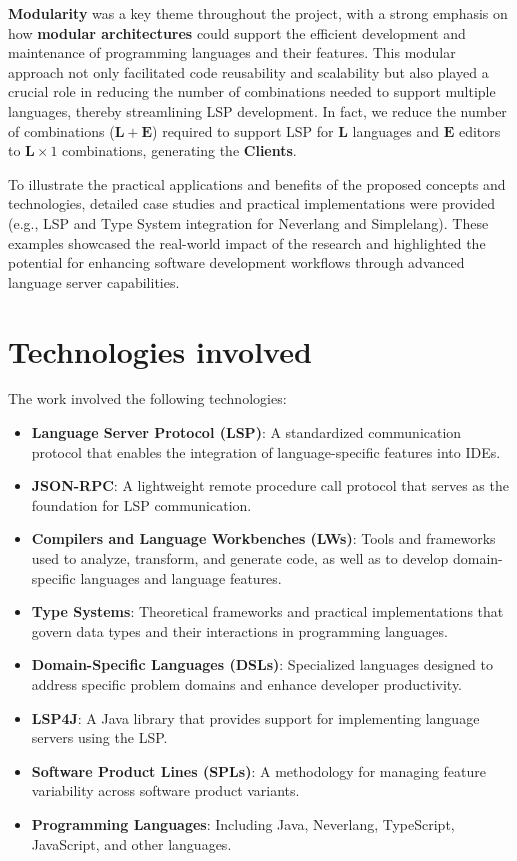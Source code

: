 \documentclass{adapt-lab}
\begin{document}
\textbf{Modularity} was a key theme throughout the project, with a strong emphasis on how \textbf{modular architectures} could support the efficient development and maintenance of programming languages and their features. This modular approach not only facilitated code reusability and scalability but also played a crucial role in reducing the number of combinations needed to support multiple languages, thereby streamlining LSP development. In fact, we reduce the number of combinations ($\mathbf{L} + \mathbf{E}$) required to support LSP for $\mathbf{L}$ languages and $\mathbf{E}$ editors to $\mathbf{L} \times 1$ combinations, generating the \textbf{Clients}.

To illustrate the practical applications and benefits of the proposed concepts and technologies, detailed case studies and practical implementations were provided (e.g., LSP and Type System integration for Neverlang and Simplelang). These examples showcased the real-world impact of the research and highlighted the potential for enhancing software development workflows through advanced language server capabilities.


\section{Technologies involved}

The work involved the following technologies:
\begin{itemize}
    \item \textbf{Language Server Protocol (LSP)}: A standardized communication protocol that enables the integration of language-specific features into IDEs.
    \item \textbf{JSON-RPC}: A lightweight remote procedure call protocol that serves as the foundation for LSP communication.
    \item \textbf{Compilers and Language Workbenches (LWs)}: Tools and frameworks used to analyze, transform, and generate code, as well as to develop domain-specific languages and language features.
    \item \textbf{Type Systems}: Theoretical frameworks and practical implementations that govern data types and their interactions in programming languages.
    \item \textbf{Domain-Specific Languages (DSLs)}: Specialized languages designed to address specific problem domains and enhance developer productivity.
        \item \textbf{LSP4J}: A Java library that provides support for implementing language servers using the LSP.
    \item \textbf{Software Product Lines (SPLs)}: A methodology for managing feature variability across software product variants.
    \item \textbf{Programming Languages}: Including Java, Neverlang, TypeScript, JavaScript, and other languages.
\end{itemize}
\end{document}
